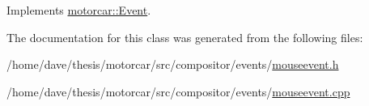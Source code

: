 Implements \hyperlink{classmotorcar_1_1Event_a195195c53c024bc76aa0e550ffe438a6}{motorcar\-::\-Event}.



The documentation for this class was generated from the following files\-:\begin{DoxyCompactItemize}
\item 
/home/dave/thesis/motorcar/src/compositor/events/\hyperlink{mouseevent_8h}{mouseevent.\-h}\item 
/home/dave/thesis/motorcar/src/compositor/events/\hyperlink{mouseevent_8cpp}{mouseevent.\-cpp}\end{DoxyCompactItemize}
